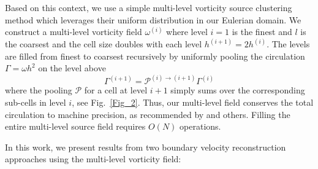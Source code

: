 \documentclass[final,1p,times]{elsarticle}
\begin{document}
Based on this context, we use a simple multi-level vorticity source clustering method which leverages their uniform distribution in our Eulerian domain. We construct a multi-level vorticity field $\omega^{(i)}$ where level $i=1$ is the finest and $l$ is the coarsest and the cell size doubles with each level $h^{(i+1)}=2h^{(i)}$. The levels are filled from finest to coarsest recursively by uniformly pooling the circulation $\Gamma=\omega h^2$ on the level above 
\begin{equation}
\Gamma^{(i+1)}=\mathcal{P}^{(i)\to(i+1)}\Gamma^{(i)}
\end{equation}
where the pooling $\mathcal{P}$ for a cell at level $i+1$ simply sums over the corresponding sub-cells in level $i$, see Fig.~\ref{Fig_2}. Thus, our multi-level field conserves the total circulation to machine precision, as recommended by \cite{Colonius2008} and others. Filling the entire multi-level source field requires $O(N)$ operations.

In this work, we present results from two boundary velocity reconstruction approaches using the multi-level vorticity field:
\end{document}
